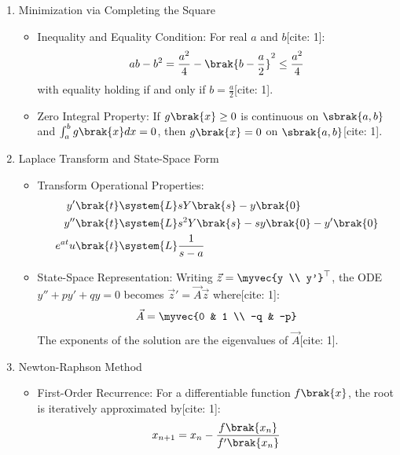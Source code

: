 \begin{enumerate}[label=\thesubsection.\arabic*, ref=\thesubsection.\theenumi,itemsep=0pt]
\item Minimization via Completing the Square
\begin{itemize}
\item Inequality and Equality Condition:
For real $a$ and $b$[cite: 1]:
\begin{align}
a b - b^2 = \frac{a^2}{4} - \brak{b - \frac{a}{2}}^2 \le \frac{a^2}{4}
\end{align}
with equality holding if and only if $b = \frac{a}{2}$[cite: 1].
\item Zero Integral Property:
If $g\brak{x} \ge 0$ is continuous on $\sbrak{a,b}$ and $\int_{a}^{b} g\brak{x} dx = 0$, then $g\brak{x} = 0$ on $\sbrak{a,b}$[cite: 1].
\end{itemize}

\item Laplace Transform and State-Space Form
\begin{itemize}
\item Transform Operational Properties:
\begin{align}
y'\brak{t} &\system{L} s Y\brak{s} - y\brak{0} \\
y''\brak{t} &\system{L} s^2 Y\brak{s} - s y\brak{0} - y'\brak{0} \\
e^{at} u\brak{t} &\system{L} \frac{1}{s - a}
\end{align}
\item State-Space Representation:
Writing $\vec{z} = \myvec{y \\ y'}^\top$, the ODE $y'' + p y' + q y = 0$ becomes $\vec{z}' = \vec{A}\vec{z}$ where[cite: 1]:
\begin{align}
\vec{A} = \myvec{0 & 1 \\ -q & -p}
\end{align}
The exponents of the solution are the eigenvalues of $\vec{A}$[cite: 1].
\end{itemize}

\item Newton-Raphson Method
\begin{itemize}
\item First-Order Recurrence:
For a differentiable function $f\brak{x}$, the root is iteratively approximated by[cite: 1]:
\begin{align}
x_{n+1} = x_n - \frac{f\brak{x_n}}{f'\brak{x_n}}
\end{align}
\end{itemize}


\end{enumerate}
